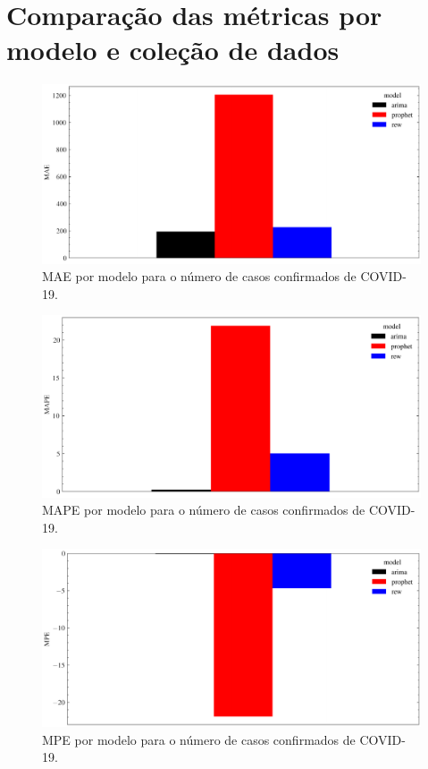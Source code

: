 \chapter{Comparação das métricas por modelo e coleção de dados}
\label{apen:a}

\begin{figure}[!htp]
    \centering
    \includegraphics[width=5.0in]{img/covid_mae_comparison.pdf}
    \caption{MAE por modelo para o número de casos confirmados de COVID-19.}
\end{figure}

\begin{figure}[!htp]
    \centering
    \includegraphics[width=5.0in]{img/covid_mape_comparison.pdf}
    \caption{MAPE por modelo para o número de casos confirmados de COVID-19.}
\end{figure}

\begin{figure}[!htp]
    \centering
    \includegraphics[width=5.0in]{img/covid_mpe_comparison.pdf}
    \caption{MPE por modelo para o número de casos confirmados de COVID-19.}
\end{figure}

